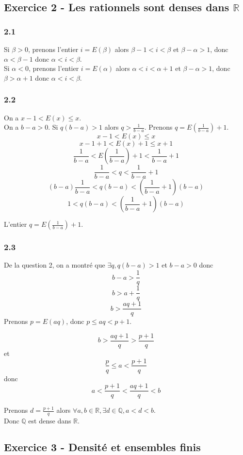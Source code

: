 \documentclass[]{book}
\theoremstyle{definition}
\newcommand{\bb}[1]{\mathbb{#1}}
\newcommand{\Q}{\bb{Q}}
\newcommand{\R}{\bb{R}}
\begin{document}
\subsection*{Exercice 2 -  Les rationnels sont denses dans $\R$}
\subsubsection*{2.1}

Si $\beta > 0$, prenons l'entier $i=E(\beta)$ alors $\beta-1<i<\beta$ et $\beta - \alpha > 1$, donc  $\alpha < \beta-1$ donc $\alpha<i<\beta$.\\

Si $\alpha < 0$, prenons l'entier $i=E(\alpha)$ alors $\alpha<i<\alpha+1$ et $\beta - \alpha > 1$, donc  $\beta > \alpha+1$ donc $\alpha<i<\beta$.\\

\subsubsection*{2.2}
On a $x-1 < E(x) \leq x$.\\ 
On a $b-a > 0$. Si $q(b-a) > 1$ alors $q>\frac{1}{b-a}$. Prenons $q=E(\frac{1}{b-a}) + 1$. 
$$x-1 < E(x) \leq x$$
$$x-1+1 < E(x)+1 \leq x+1$$
$$\frac{1}{b-a} < E(\frac{1}{b-a}) + 1 < \frac{1}{b-a}+1$$
$$\frac{1}{b-a} < q < \frac{1}{b-a}+1$$
$$(b-a)\frac{1}{b-a} < q(b-a) < (\frac{1}{b-a}+1)(b-a)$$
$$1 < q(b-a) < (\frac{1}{b-a}+1)(b-a)$$

L'entier $q=E(\frac{1}{b-a}) + 1$.

\subsubsection*{2.3}
De la question 2, on a montr\'e que $\exists q, q(b-a)>1$ et $b-a>0$ donc 
$$b-a>\frac{1}{q}$$
$$b> a+\frac{1}{q}$$
$$b>\frac{aq + 1}{q}$$
Prenons $p=E(aq)$, donc $p \leq aq < p+1$.

$$b>\frac{aq + 1}{q} > \frac{p + 1}{q}$$
et
$$\frac{p}{q} \leq a < \frac{p+1}{q}$$
donc
$$a < \frac{p+1}{q} < \frac{aq + 1}{q} < b$$

Prenons $d=\frac{p+1}{q}$ alors $\forall a,b \in \R, \exists d \in \Q, a < d < b$. \\
Donc $\Q$ est dense dans $\R$.

\subsection*{Exercice 3 - Densit\'e et ensembles finis}
\end{document}
